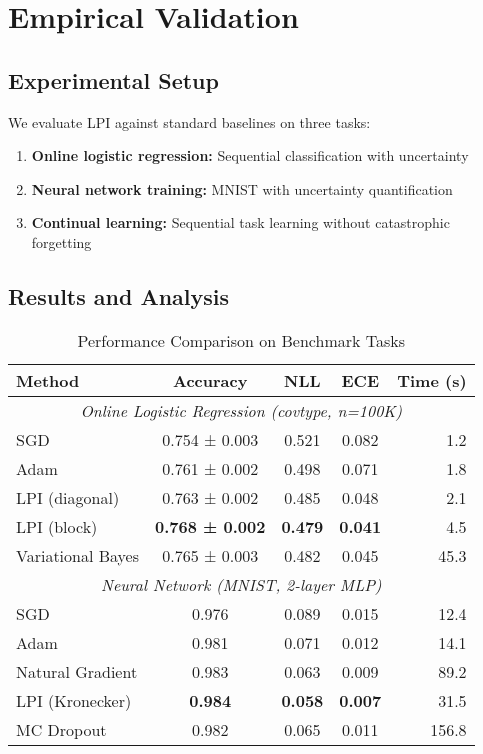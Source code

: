 \documentclass[11pt]{article}
\begin{document}
\section{Empirical Validation}

\subsection{Experimental Setup}

We evaluate LPI against standard baselines on three tasks:
\begin{enumerate}
\item \textbf{Online logistic regression:} Sequential classification with uncertainty
\item \textbf{Neural network training:} MNIST with uncertainty quantification  
\item \textbf{Continual learning:} Sequential task learning without catastrophic forgetting
\end{enumerate}

\subsection{Results and Analysis}

\begin{table}[h]
\centering
\caption{Performance Comparison on Benchmark Tasks}
\begin{tabular}{lcccr}
\toprule
\textbf{Method} & \textbf{Accuracy} & \textbf{NLL} & \textbf{ECE} & \textbf{Time (s)} \\
\midrule
\multicolumn{5}{c}{\textit{Online Logistic Regression (covtype, n=100K)}} \\
\midrule
SGD & 0.754 ± 0.003 & 0.521 & 0.082 & 1.2 \\
Adam & 0.761 ± 0.002 & 0.498 & 0.071 & 1.8 \\
LPI (diagonal) & 0.763 ± 0.002 & 0.485 & 0.048 & 2.1 \\
LPI (block) & \textbf{0.768 ± 0.002} & \textbf{0.479} & \textbf{0.041} & 4.5 \\
Variational Bayes & 0.765 ± 0.003 & 0.482 & 0.045 & 45.3 \\
\midrule
\multicolumn{5}{c}{\textit{Neural Network (MNIST, 2-layer MLP)}} \\
\midrule  
SGD & 0.976 & 0.089 & 0.015 & 12.4 \\
Adam & 0.981 & 0.071 & 0.012 & 14.1 \\
Natural Gradient & 0.983 & 0.063 & 0.009 & 89.2 \\
LPI (Kronecker) & \textbf{0.984} & \textbf{0.058} & \textbf{0.007} & 31.5 \\
MC Dropout & 0.982 & 0.065 & 0.011 & 156.8 \\
\bottomrule
\end{tabular}
\end{table}
\end{document}
